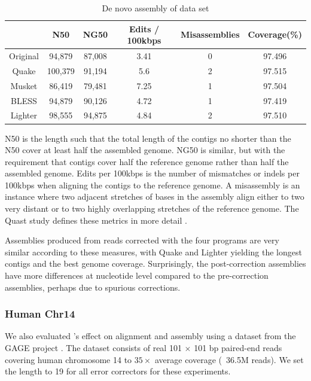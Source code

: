 \documentclass{bmcart}
\begin{document}
\begin{table}
\centering
\begin{tabular}{|c|c|c|c|c|c|} \hline
	 	& N50 &	NG50	 & Edits / 100kbps&	Misassemblies	& Coverage(\%) \\ \hline
Original &	94,879 &	87,008	& 3.41	& 0	& 97.496  \\ \hline
Quake	& 100,379 &	91,194	& 5.6	& 2	 & 97.515  \\ \hline
Musket	& 86,419  &	79,481	& 7.25	& 1	 & 97.504  \\ \hline
BLESS	& 94,879  &	90,126	& 4.72	& 1	& 97.419  \\ \hline
Lighter	& 98,555  &	94,875	& 4.84	& 2	& 97.510  \\ \hline

\end{tabular}
\caption{De novo assembly of \ecoli data set\label{table:ecoli_assembly}}
\end{table}

N50 is the length such that the total length of the contigs no shorter than the N50 cover at least half the assembled genome.  NG50 is similar, but with the requirement that contigs cover half the reference genome rather than half the assembled genome. Edits per 100kbps is the number of mismatches or indels per 100kbps when aligning the contigs to the reference genome. A misassembly is an instance where two adjacent stretches of bases in the assembly align either to two very distant or to two highly overlapping stretches of the reference genome.  The Quast study defines these metrics in more detail \cite{gurevich2013quast}.

Assemblies produced from reads corrected with the four programs are very similar according to these measures, with Quake and Lighter yielding the longest contigs and the best genome coverage. Surprisingly, the post-correction assemblies have more differences at nucleotide level compared to the pre-correction assemblies, perhaps due to spurious corrections.

\subsubsection*{Human Chr14}
We also evaluated \tool's effect on alignment and assembly using a dataset from the GAGE project \cite{salzberg2012gage}.  The dataset consists of real 101 $\times$ 101 bp paired-end reads covering human chromosome 14 to $35\times$ average coverage (~36.5M reads).  We set the \kmer length to 19 for all error correctors for these experiments.
\end{document}
